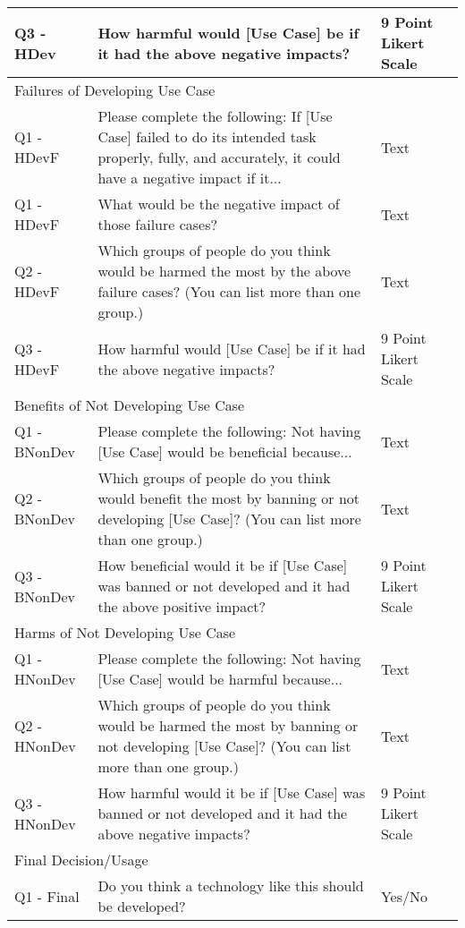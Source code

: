 \begin{table}[!hbpt]
\begin{tabularx}{\linewidth}{l|X|l}
         Q3 - HDev & How harmful would [Use Case] be if it had the above negative impacts? & 9 Point Likert Scale \\
         \midrule
         \multicolumn{3}{l}{Failures of Developing Use Case}\\
         \midrule
         Q1 - HDevF & Please complete the following: If [Use Case] failed to do its intended task properly, fully, and accurately, it could have a negative impact if it... & Text \\
         Q1 - HDevF & What would be the negative impact of those failure cases? & Text \\
         Q2 - HDevF & Which groups of people do you think would be harmed the most by the above failure cases? (You can list more than one group.) & Text \\
         Q3 - HDevF & How harmful would [Use Case] be if it had the above negative impacts? & 9 Point Likert Scale \\
         \midrule
         \multicolumn{3}{l}{Benefits of Not Developing Use Case}\\
         \midrule
         Q1 - BNonDev & Please complete the following: Not having [Use Case] would be beneficial because... & Text \\
         Q2 - BNonDev & Which groups of people do you think would benefit the most by banning or not developing [Use Case]?
(You can list more than one group.) & Text \\
         Q3 - BNonDev & How beneficial would it be if [Use Case] was banned or not developed and it had the above positive impact? & 9 Point Likert Scale \\
         \midrule
         \multicolumn{3}{l}{Harms of Not Developing Use Case}\\
         \midrule
         Q1 - HNonDev & Please complete the following: Not having [Use Case] would be harmful because... & Text \\
         Q2 - HNonDev & Which groups of people do you think would be harmed the most by banning or not developing [Use Case]? (You can list more than one group.) & Text \\
         Q3 - HNonDev & How harmful would it be if [Use Case] was banned or not developed and it had the above negative impacts? & 9 Point Likert Scale \\
         \midrule
         \multicolumn{3}{l}{Final Decision/Usage}\\
         \midrule
         Q1 - Final & Do you think a technology like this should be developed? & Yes/No\\

\end{tabularx}
\end{table}
